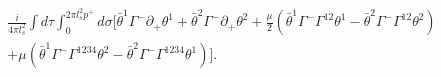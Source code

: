 \begin{equation}
\begin{aligned}
\frac{i}{4 \pi l_s^2} \int d \tau \int_{0}^{2 \pi l_s^2 p^+} d \sigma
\Bigg[
 \bar{\theta}^1 \Gamma^- \partial_+ \theta^1 +
 \bar{\theta}^2 \Gamma^- \partial_+ \theta^2     
 + \frac{\mu}{2} \left(  \bar{\theta}^1 \Gamma^- \Gamma^{12}  \theta^1 -
                         \bar{\theta}^2 \Gamma^- \Gamma^{12}  \theta^2 \right)  \\
 + \mu \left(  \bar{\theta}^1 \Gamma^- \Gamma^{1234}  \theta^2 -
                         \bar{\theta}^2 \Gamma^- \Gamma^{1234} \theta^1 \right)
\Bigg].
\end{aligned}
\end{equation}

